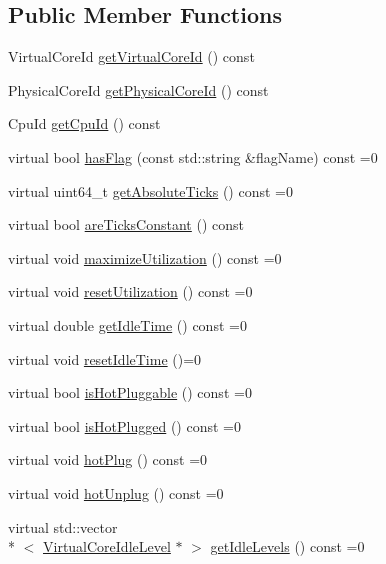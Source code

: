 \subsection*{Public Member Functions}
\begin{DoxyCompactItemize}
\item 
Virtual\-Core\-Id \hyperlink{classmammut_1_1topology_1_1VirtualCore_ae9b5118e3e28805d4d9b3429d1b215a7}{get\-Virtual\-Core\-Id} () const 
\item 
Physical\-Core\-Id \hyperlink{classmammut_1_1topology_1_1VirtualCore_a2af7ef4acf15330f86050c2aff354a71}{get\-Physical\-Core\-Id} () const 
\item 
Cpu\-Id \hyperlink{classmammut_1_1topology_1_1VirtualCore_aa2c26a312e610dd2f6e9aa8fbcd35223}{get\-Cpu\-Id} () const 
\item 
virtual bool \hyperlink{classmammut_1_1topology_1_1VirtualCore_aa9f4400708c97197f66bcd11aa0eb990}{has\-Flag} (const std\-::string \&flag\-Name) const =0
\item 
virtual uint64\-\_\-t \hyperlink{classmammut_1_1topology_1_1VirtualCore_a0b1ac9c138d1ed5e8eceb38e619e1e65}{get\-Absolute\-Ticks} () const =0
\item 
virtual bool \hyperlink{classmammut_1_1topology_1_1VirtualCore_a545414bb4933faeba1f071e8a2ed4202}{are\-Ticks\-Constant} () const 
\item 
virtual void \hyperlink{classmammut_1_1topology_1_1VirtualCore_ac4e3a17bc401689c387f27a90e24daf5}{maximize\-Utilization} () const =0
\item 
virtual void \hyperlink{classmammut_1_1topology_1_1VirtualCore_a94374b13113f0294c5178b6fc275ecc0}{reset\-Utilization} () const =0
\item 
virtual double \hyperlink{classmammut_1_1topology_1_1VirtualCore_ad4a33cf2323e7b05537485e4b08a4f12}{get\-Idle\-Time} () const =0
\item 
virtual void \hyperlink{classmammut_1_1topology_1_1VirtualCore_a8fc6a3a4882ca369e37a3a9f0f668d9c}{reset\-Idle\-Time} ()=0
\item 
virtual bool \hyperlink{classmammut_1_1topology_1_1VirtualCore_ab8eb88bee673244367a5394de87142d5}{is\-Hot\-Pluggable} () const =0
\item 
virtual bool \hyperlink{classmammut_1_1topology_1_1VirtualCore_a61bd18dbc9bd35f6b22e9bbd7947427d}{is\-Hot\-Plugged} () const =0
\item 
virtual void \hyperlink{classmammut_1_1topology_1_1VirtualCore_a7674d352e60bb8d9c183ca54f62b383d}{hot\-Plug} () const =0
\item 
virtual void \hyperlink{classmammut_1_1topology_1_1VirtualCore_a1e8ce49fd0885331533fa85ad7504a9d}{hot\-Unplug} () const =0
\item 
virtual std\-::vector\\*
$<$ \hyperlink{classmammut_1_1topology_1_1VirtualCoreIdleLevel}{Virtual\-Core\-Idle\-Level} $\ast$ $>$ \hyperlink{classmammut_1_1topology_1_1VirtualCore_a841dd64b1b74b28a0533cc1aa9d8cb84}{get\-Idle\-Levels} () const =0
\end{DoxyCompactItemize}
